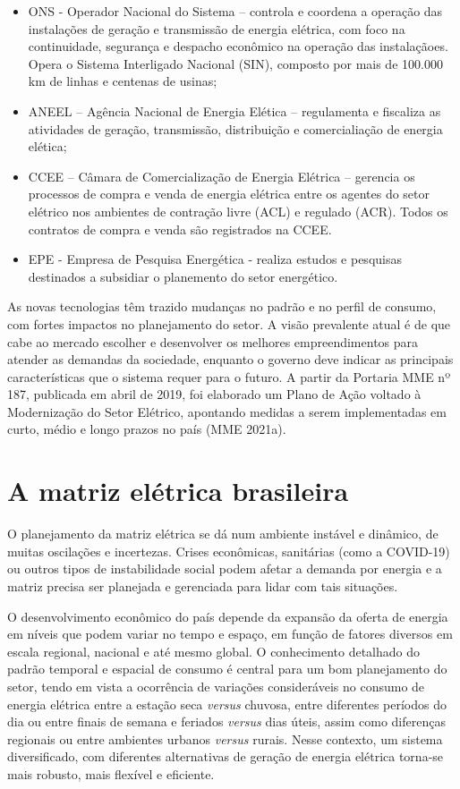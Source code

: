 \documentclass[
  oneside]{scrbook}
\providecommand{\tightlist}{%
  \setlength{\itemsep}{0pt}\setlength{\parskip}{0pt}}
\begin{document}
\begin{itemize}
\tightlist
\item
  ONS - Operador Nacional do Sistema -- controla e coordena a operação das instalações de geração e transmissão de energia elétrica, com foco na continuidade, segurança e despacho econômico na operação das instalaçãoes. Opera o Sistema Interligado Nacional (SIN), composto por mais de 100.000 km de linhas e centenas de usinas;
\item
  ANEEL -- Agência Nacional de Energia Elética -- regulamenta e fiscaliza as atividades de geração, transmissão, distribuição e comercialiação de energia elética;
\item
  CCEE -- Câmara de Comercialização de Energia Elétrica -- gerencia os processos de compra e venda de energia elétrica entre os agentes do setor elétrico nos ambientes de contração livre (ACL) e regulado (ACR). Todos os contratos de compra e venda são registrados na CCEE.
\item
  EPE - Empresa de Pesquisa Energética - realiza estudos e pesquisas destinados a subsidiar o planemento do setor energético.
\end{itemize}

As novas tecnologias têm trazido mudanças no padrão e no perfil de consumo, com fortes impactos no planejamento do setor. A visão prevalente atual é de que cabe ao mercado escolher e desenvolver os melhores empreendimentos para atender as demandas da sociedade, enquanto o governo deve indicar as principais características que o sistema requer para o futuro. A partir da Portaria MME nº 187, publicada em abril de 2019, foi elaborado um Plano de Ação voltado à Modernização do Setor Elétrico, apontando medidas a serem implementadas em curto, médio e longo prazos no país (MME 2021a).

\hypertarget{a-matriz-eluxe9trica-brasileira}{%
\section{A matriz elétrica brasileira}\label{a-matriz-eluxe9trica-brasileira}}

O planejamento da matriz elétrica se dá num ambiente instável e dinâmico, de muitas oscilações e incertezas. Crises econômicas, sanitárias (como a COVID-19) ou outros tipos de instabilidade social podem afetar a demanda por energia e a matriz precisa ser planejada e gerenciada para lidar com tais situações.

O desenvolvimento econômico do país depende da expansão da oferta de energia em níveis que podem variar no tempo e espaço, em função de fatores diversos em escala regional, nacional e até mesmo global. O conhecimento detalhado do padrão temporal e espacial de consumo é central para um bom planejamento do setor, tendo em vista a ocorrência de variações consideráveis no consumo de energia elétrica entre a estação seca \emph{versus} chuvosa, entre diferentes períodos do dia ou entre finais de semana e feriados \emph{versus} dias úteis, assim como diferenças regionais ou entre ambientes urbanos \emph{versus} rurais. Nesse contexto, um sistema diversificado, com diferentes alternativas de geração de energia elétrica torna-se mais robusto, mais flexível e eficiente.
\end{document}
